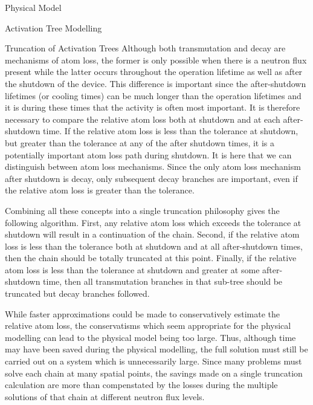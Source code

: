 \begin{chapter}{Physical Model\label{chap:physical}}
\begin{section}{Activation Tree Modelling\label{sec:physical.chains}}
\begin{subsection}{Truncation of Activation Trees}
    Although both transmutation and decay are mechanisms of atom loss,
    the former is only possible when there is a neutron flux present
    while the latter occurs throughout the operation lifetime as well
    as after the shutdown of the device.  This difference is important
    since the after-shutdown lifetimes (or cooling times) can be much
    longer than the operation lifetimes and it is during these times
    that the activity is often most important.  It is therefore
    necessary to compare the relative atom loss both at shutdown and
    at each after-shutdown time.  If the relative atom loss is less
    than the tolerance at shutdown, but greater than the tolerance at
    any of the after shutdown times, it is a potentially important
    atom loss path during shutdown.  It is here that we can
    distinguish between atom loss mechanisms.  Since the only atom
    loss mechanism after shutdown is decay, only subsequent decay
    branches are important, even if the relative atom loss is greater
    than the tolerance.

    Combining all these concepts into a single truncation philosophy
    gives the following algorithm.  First, any relative atom loss
    which exceeds the tolerance at shutdown will result in a
    continuation of the chain.  Second, if the relative atom loss is
    less than the tolerance both at shutdown and at all after-shutdown
    times, then the chain should be totally truncated at this point.
    Finally, if the relative atom loss is less than the tolerance at
    shutdown and greater at some after-shutdown time, then all
    transmutation branches in that sub-tree should be truncated but
    decay branches followed.
    
    While faster approximations could be made to conservatively
    estimate the relative atom loss, the conservatisms which seem
    appropriate for the physical modelling can lead to the physical
    model being too large.  Thus, although time may have been saved
    during the physical modelling, the full solution must still be
    carried out on a system which is unnecessarily large.  Since many
    problems must solve each chain at many spatial points, the savings
    made on a single truncation calculation are more than compenstated
    by the losses during the multiple solutions of that chain at
    different neutron flux levels.
    

\end{subsection}
\end{section}
\end{chapter}
